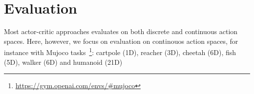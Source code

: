 \section{Evaluation}















Most actor-critic approaches evaluates on both discrete and continuous action spaces.
Here, however, we focus on evaluation on continouos action spaces,
for instance with Mujoco tasks~\footnote{\url{https://gym.openai.com/envs/\#mujoco}}:
cartpole (1D), reacher (3D), cheetah (6D), fish (5D), walker (6D) and humanoid (21D)

